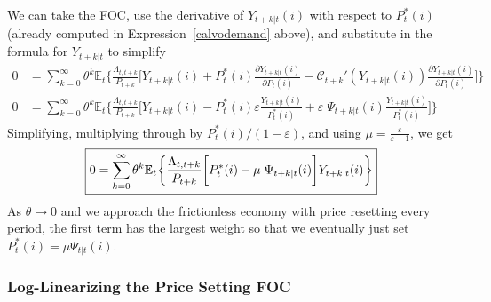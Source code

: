 \documentclass[12pt]{article}
\theoremstyle{plain}
\theoremstyle{definition}
\theoremstyle{remark}
\newcommand{\ra}{\rightarrow}
\newcommand{\calC}{\mathcal{C}}
\newcommand{\E}{\mathbb{E}}
\begin{document}
We can take the FOC, use the derivative of $Y_{t+k|t}(i)$ with
respect to $P_t^*(i)$ (already computed in
Expression~\ref{calvodemand} above), and substitute in the formula
for $Y_{t+k|t}$ to simplify
\begin{align*}
  0
  &=
  \sum_{k=0}^\infty
  \theta^k
  \E_t\bigg\{
  \frac{\Lambda_{t,t+k}}{P_{t+k}}
  \bigg[
  Y_{t+k|t}(i)
  +
  P_t^*(i)
  \frac{\partial Y_{t+k|t}(i)}{\partial P_t(i)}
  - \calC_{t+k}'(Y_{t+k|t}(i))
  \frac{\partial Y_{t+k|t}(i)}{\partial P_t(i)}
  \bigg]
  \bigg\}
  \\
  0
  &=
  \sum_{k=0}^\infty
  \theta^k
  \E_t\bigg\{
  \frac{\Lambda_{t,t+k}}{P_{t+k}}
  \bigg[
  Y_{t+k|t}(i)
  - P_t^*(i)
  \varepsilon \frac{Y_{t+k|t}(i)}{P_t^*(i)}
  + \varepsilon \; \Psi_{t+k|t}(i)
  \frac{Y_{t+k|t}(i)}{P_t^*(i)}
  \bigg]
  \bigg\}
\end{align*}
Simplifying, multiplying through by $P_t^*(i)/(1-\varepsilon)$, and
using $\mu=\frac{\varepsilon}{\varepsilon-1}$, we get
\begin{align*}
  \boxed{%
  0
  =
  \sum_{k=0}^\infty
  \theta^k
  \E_t\bigg\{
  \frac{\Lambda_{t,t+k}}{P_{t+k}}
  \bigg[
  P_t^*(i)
  - \mu\;\Psi_{t+k|t}(i)
  \bigg]Y_{t+k|t}(i)
  \bigg\}
  }
\end{align*}
As $\theta\ra 0$ and we approach the frictionless economy with price
resetting every period, the first term has the largest weight so
that we eventually just set $P_t^*(i)=\mu \Psi_{t|t}(i)$.


\clearpage
\subsubsection{Log-Linearizing the Price Setting FOC}
\end{document}
